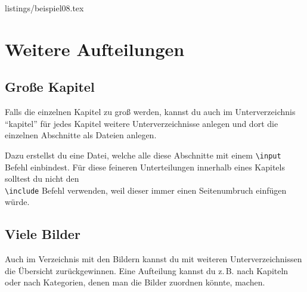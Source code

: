 %
	{listings/beispiel08.tex}

\section{Weitere Aufteilungen}

\subsection{Große Kapitel}

Falls die einzelnen Kapitel zu groß werden, kannst du auch im Unterverzeichnis \enquote{kapitel} für jedes Kapitel weitere Unterverzeichnisse anlegen und dort die einzelnen Abschnitte als Dateien anlegen.

Dazu erstellst du eine Datei, welche alle diese Abschnitte mit einem \texttt{\textbackslash input} Befehl einbindest. Für diese feineren Unterteilungen innerhalb eines Kapitels solltest du nicht den\\ \texttt{\textbackslash include} Befehl verwenden, weil dieser immer einen Seitenumbruch einfügen würde.

\subsection{Viele Bilder}

Auch im Verzeichnis mit den Bildern kannst du mit weiteren Unterverzeichnissen die Übersicht zurückgewinnen. Eine Aufteilung kannst du z.\,B. nach Kapiteln oder nach Kategorien, denen man die Bilder zuordnen könnte, machen.

%
%
